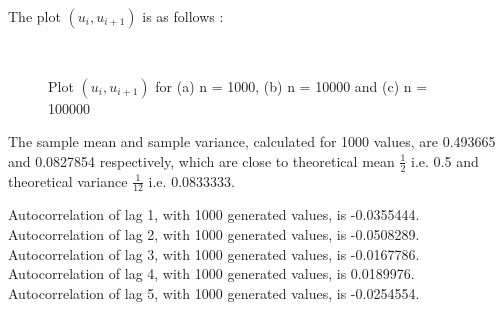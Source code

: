 \documentclass[11pt]{article}
\begin{document}
The plot $(u_i , u_{i+1})$ is as follows :

\begin{figure}[H]
  \centering
  \hspace{10mm}
  \\
    \caption{Plot $(u_i , u_{i+1})$ for (a) n = 1000, (b) n = 10000 and (c) n = 100000}
\end{figure}

The sample mean and sample variance, calculated for 1000 values, are 0.493665 and 0.0827854 respectively, which are close to theoretical mean $\frac{1}{2}$ i.e. 0.5 and theoretical variance $\frac{1}{12}$ i.e. 0.0833333.

Autocorrelation of lag 1, with 1000 generated values, is -0.0355444.\\
Autocorrelation of lag 2, with 1000 generated values, is -0.0508289.\\
Autocorrelation of lag 3, with 1000 generated values, is -0.0167786.\\
Autocorrelation of lag 4, with 1000 generated values, is 0.0189976.\\
Autocorrelation of lag 5, with 1000 generated values, is -0.0254554.
\end{document}
